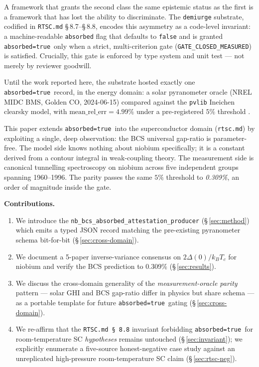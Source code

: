 \documentclass[11pt,a4paper]{article}
\newcommand{\absorbedtrue}{\textcolor{honestgreen}{\texttt{absorbed=true}}}
\newcommand{\gateclosedmeas}{\texttt{GATE\_CLOSED\_MEASURED}}
\begin{document}
A framework that grants the second class the same epistemic status as
the first is a framework that has lost the ability to discriminate.
The \texttt{demiurge} substrate, codified in \texttt{RTSC.md}
\S\,8.7--\S\,8.8, encodes this asymmetry as a code-level invariant: a
machine-readable \texttt{absorbed} flag that defaults to \texttt{false}
and is granted \absorbedtrue\ only when a strict, multi-criterion gate
(\gateclosedmeas) is satisfied. Crucially, this gate is enforced by
type system and unit test --- not merely by reviewer goodwill.

Until the work reported here, the substrate hosted exactly one
\absorbedtrue\ record, in the energy domain: a solar pyranometer
oracle (NREL MIDC BMS, Golden CO, 2024-06-15) compared against the
\texttt{pvlib} Ineichen clearsky model, with \(\mathrm{mean\_rel\_err}
= 4.99\%\) under a pre-registered \(5\%\) threshold
\cite{pvlib2024,nrelmidc}.

This paper extends \absorbedtrue\ into the superconductor domain
(\texttt{rtsc.md}) by exploiting a single, deep observation: the BCS
universal gap-ratio is parameter-free. The model side knows nothing
about niobium specifically; it is a constant derived from a contour
integral in weak-coupling theory. The measurement side is canonical
tunnelling spectroscopy on niobium across five independent
groups spanning 1960--1996. The parity passes the same \(5\%\)
threshold to \emph{0.309\%}, an order of magnitude inside the gate.

\medskip
\noindent\textbf{Contributions.}
\begin{enumerate}\itemsep0.3em
\item We introduce the \texttt{nb\_bcs\_absorbed\_attestation\_producer}
  (\S\,\ref{sec:method}) which emits a typed JSON record matching the
  pre-existing pyranometer schema bit-for-bit (\S\,\ref{sec:cross-domain}).
\item We document a 5-paper inverse-variance consensus on
  \(2\Delta(0)/k_{B}T_{c}\) for niobium and verify the BCS prediction
  to 0.309\% (\S\,\ref{sec:results}).
\item We discuss the cross-domain generality of the
  \emph{measurement-oracle parity} pattern --- solar GHI and BCS
  gap-ratio differ in physics but share schema --- as a portable
  template for future \absorbedtrue\ gating (\S\,\ref{sec:cross-domain}).
\item We re-affirm that the \texttt{RTSC.md \S\,8.8} invariant
  forbidding \absorbedtrue\ for room-temperature SC \emph{hypotheses}
  remains untouched (\S\,\ref{sec:invariant}); we explicitly enumerate
  a five-source honest-negative case study against an unreplicated
  high-pressure room-temperature SC claim (\S\,\ref{sec:rtsc-neg}).
\end{enumerate}
\end{document}
